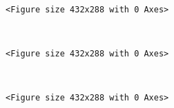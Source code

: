\documentclass[11pt]{article}
\begin{document}
    
    \begin{center}
    \end{center}
    { \hspace*{\fill} \\}
    
    
    \begin{verbatim}
<Figure size 432x288 with 0 Axes>
    \end{verbatim}

    
    \begin{center}
    \end{center}
    { \hspace*{\fill} \\}
    
    
    \begin{verbatim}
<Figure size 432x288 with 0 Axes>
    \end{verbatim}

    
    \begin{center}
    \end{center}
    { \hspace*{\fill} \\}
    
    
    \begin{verbatim}
<Figure size 432x288 with 0 Axes>
    \end{verbatim}

    
    \begin{center}
    \end{center}
    { \hspace*{\fill} \\}
    
\end{document}
